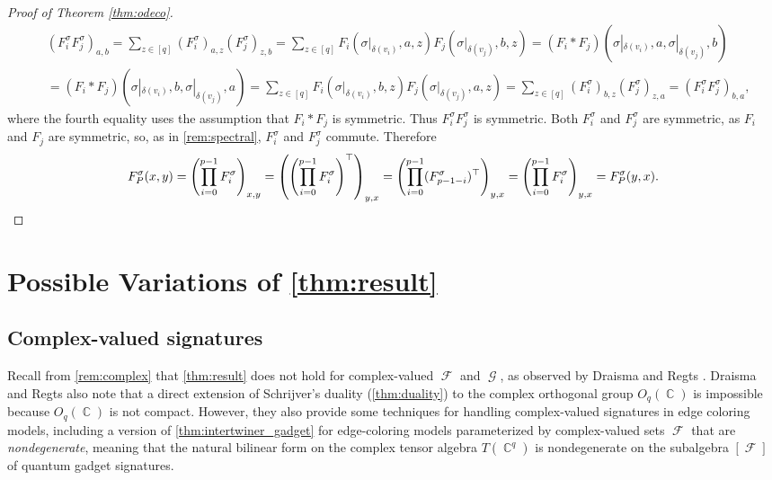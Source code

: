 \documentclass{theoretics}
\DeclareMathOperator{\cc}{\mathbb{C}}
\DeclareMathOperator{\fc}{\mathcal{F}}
\DeclareMathOperator{\gc}{\mathcal{G}}
\begin{document}
\begin{proof}[Proof of Theorem \ref{thm:odeco}]
    \begin{align*}
        &(F_i^\sigma F_j^\sigma)_{a,b} = \sum_{z \in [q]} (F_i^\sigma)_{a,z} (F_j^\sigma)_{z,b}
        = \sum_{z \in [q]} F_i(\sigma|_{\delta(v_i)}, a,z) F_j(\sigma|_{\delta(v_j)}, b,z)
        = (F_i * F_j)(\sigma|_{\delta(v_i)}, a, \sigma|_{\delta(v_j)}, b) \\
        &= (F_i * F_j)(\sigma|_{\delta(v_i)}, b, \sigma|_{\delta(v_j)}, a)
        = \sum_{z \in [q]} F_i(\sigma|_{\delta(v_i)}, b,z) F_j(\sigma|_{\delta(v_j)}, a,z) 
        = \sum_{z \in [q]} (F_i^\sigma)_{b,z} (F_j^\sigma)_{z,a}
        = (F_i^\sigma F_j^\sigma)_{b,a},
        \label{eq:swap}
    \end{align*}
    where the fourth equality uses the assumption that $F_i * F_j$ is symmetric.
    Thus $F_i^\sigma F_j^\sigma$ is symmetric. Both $F_i^\sigma$ 
    and $F_j^\sigma$ are symmetric, as $F_i$ and $F_j$ are symmetric, so, as in \autoref{rem:spectral},
    $F^\sigma_i$ and $F^\sigma_j$ commute. Therefore
    \[
        F^\sigma_P(x,y)
        = \left(\prod_{i=0}^{p-1} F^\sigma_i\right)_{x,y}
        = \left(\left(\prod_{i=0}^{p-1} F^\sigma_i\right)^\top\right)_{y,x}
        = \left(\prod_{i=0}^{p-1} (F^\sigma_{p-1-i})^\top\right)_{y,x}
        = \left(\prod_{i=0}^{p-1} F^\sigma_i\right)_{y,x}
        = F^\sigma_P(y,x). \qedhere
    \]
\end{proof}

\section{Possible Variations of \autoref{thm:result}}
\label{sec:variations}
\subsection{Complex-valued signatures}
\label{sec:complex}
Recall from \autoref{rem:complex} that \autoref{thm:result} does not hold for complex-valued
$\fc$ and $\gc$, as observed by Draisma and Regts \cite{draisma_tensor_2013}.
Draisma and Regts also note that a direct extension of Schrijver's duality 
(\autoref{thm:duality}) to the complex
orthogonal group $O_q(\cc)$ is impossible because $O_q(\cc)$ is not compact. However, they
also provide some techniques for handling complex-valued
signatures in edge coloring models, including a version \cite[Theorem 3]{draisma_tensor_2013} of \autoref{thm:intertwiner_gadget}
for edge-coloring models parameterized by complex-valued sets $\fc$ that are
\emph{nondegenerate}, meaning that the natural bilinear form on the complex tensor
algebra $T(\cc^q)$ is nondegenerate on the subalgebra $[\fc]$ of quantum gadget signatures.
\end{document}
